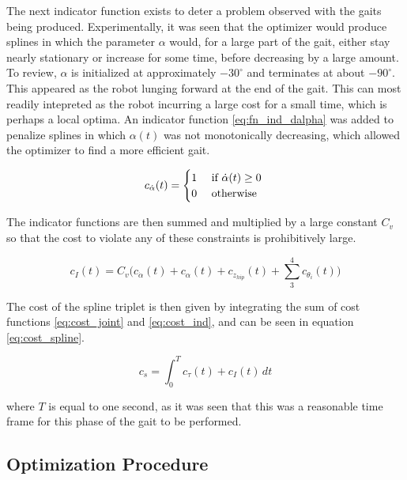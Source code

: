 The next indicator function exists to deter a problem observed with the gaits being produced. 
Experimentally, it was seen that the optimizer would produce splines in which the parameter
$\alpha$ would, for a large part of the gait, either stay nearly stationary or increase for some time, before
decreasing by a large amount. To review, $\alpha$ is initialized at approximately $-30^\circ$ and terminates at about $-90^\circ$.
This appeared as the robot lunging forward at the end of the gait.
This can most readily intepreted as the robot incurring a large cost for a small time, which is perhaps
a local optima. An indicator function \ref{eq:fn_ind_dalpha} was added to penalize splines in which 
$\alpha (t)$ was not monotonically decreasing, which allowed the optimizer to find a more efficient gait.

\begin{equation} 
	c_{\dot \alpha}(t) =
  	\begin{cases} 
    	\hfill 1 \hfill & \text{ if $\dot \alpha(t) \ge 0$ } \\
      \hfill 0 \hfill & \text{ otherwise }
  	\end{cases} \label{eq:fn_ind_dalpha}
\end{equation}

The indicator functions are then summed and multiplied by a large constant $C_v$ so that the cost to
violate any of these constraints is prohibitively large.

\begin{equation}
	c_I(t) = C_v \Big( c_{\dot \alpha}(t) + c_{\alpha}(t) + c_{z_{hip}}(t) + \sum_3^4 c_{\theta_i}(t) \Big) \label{eq:cost_ind}
\end{equation}

The cost of the spline triplet is then given by integrating the sum of cost functions \ref{eq:cost_joint} and
\ref{eq:cost_ind}, and can be seen in equation \ref{eq:cost_spline}.

\begin{equation}
c_s = \int_0^T c_{\tau}(t) + c_I(t) \, dt \label{eq:cost_spline}
\end{equation}

where $T$ is equal to one second, as it was seen that this was a reasonable time frame for this phase of the gait
to be performed. 

\subsection{Optimization Procedure}

